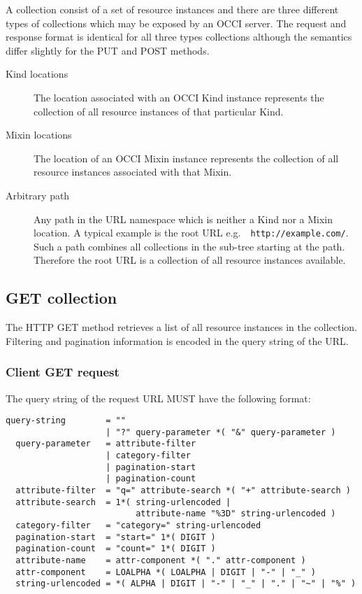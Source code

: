 \documentclass[10pt,a4paper]{article}
\begin{document}
A collection consist of a set of resource instances and there are three
different types of collections which may be exposed by an OCCI server.  The
request and response format is identical for all three types collections
although the semantics differ slightly for the PUT and POST methods.
\begin{description}
\item[Kind locations] The location associated with an OCCI Kind instance
represents the collection of all resource instances of that particular Kind.
\item[Mixin locations] The location of an OCCI Mixin instance represents the
collection of all resource instances associated with that Mixin.
\item[Arbitrary path] Any path in the URL namespace which is neither a Kind nor
a Mixin location. A typical example is the root URL e.g.~{\tt
http://example.com/}. Such a path combines all collections in the sub-tree
starting at the path. Therefore the root URL is a collection of all resource
instances available.
\end{description}

\subsection{GET collection}
The HTTP GET method retrieves a list of all resource instances in the
collection. Filtering and pagination information is encoded in the query string
of the URL.

\subsubsection{Client GET request}
The query string of the request URL MUST have the following format:
\begin{verbatim}
query-string        = ""
                    | "?" query-parameter *( "&" query-parameter )
  query-parameter   = attribute-filter
                    | category-filter
                    | pagination-start
                    | pagination-count
  attribute-filter  = "q=" attribute-search *( "+" attribute-search )
  attribute-search  = 1*( string-urlencoded |
                          attribute-name "%3D" string-urlencoded )
  category-filter   = "category=" string-urlencoded
  pagination-start  = "start=" 1*( DIGIT )
  pagination-count  = "count=" 1*( DIGIT )
  attribute-name    = attr-component *( "." attr-component )
  attr-component    = LOALPHA *( LOALPHA | DIGIT | "-" | "_" )
  string-urlencoded = *( ALPHA | DIGIT | "-" | "_" | "." | "~" | "%" )

\end{verbatim}
\end{document}
